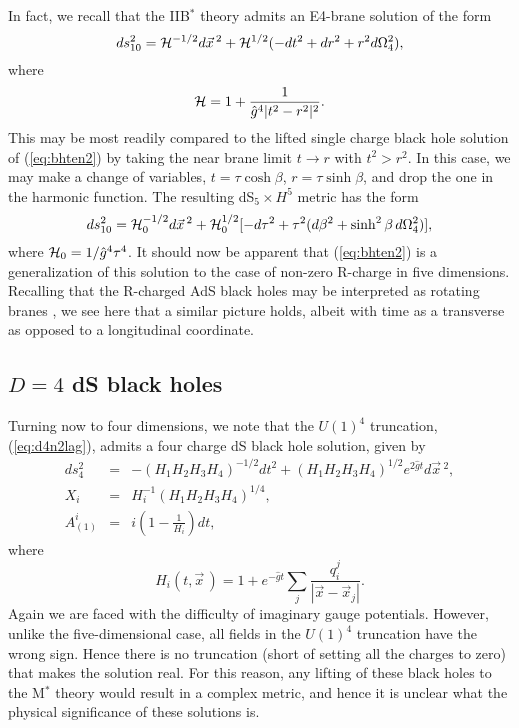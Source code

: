 \documentclass[a4paper,12pt]{article}
\newcommand{\fft}[2]{{\frac{#1}{#2}}}
\begin{document}
In fact, we recall that the IIB$^*$ theory admits an E4-brane solution of
the form \cite{Hull:1998vg}
%
\begin{equation}
ds_{10}^2={\cal H}^{-1/2}d\vec x\,^2+{\cal H}^{1/2}(-dt^2+dr^2+r^2d\Omega_4^2),
\end{equation}
%
where
%
\begin{equation}
{\cal H}=1+\fft1{\hat g^4|t^2-r^2|^2}.
\end{equation}
%
This may be most readily compared to the lifted single charge black hole
solution of (\ref{eq:bhten2}) by taking the near brane limit $t\to r$ with
$t^2>r^2$.  In this case, we may make a change of variables,
$t=\tau\cosh\beta$, $r=\tau\sinh\beta$, and drop the one in the harmonic
function.  The resulting dS$_5\times H^5$ metric has the form
%
\begin{equation}
ds_{10}^2={\cal H}_0^{-1/2}d\vec x\,^2+{\cal H}_0^{1/2}[-d\tau^2
+\tau^2(d\beta^2+\sinh^2\beta\,d\Omega_4^2)],
\end{equation}
%
where ${\cal H}_0=1/\hat g^4\tau^4$.  It should now be apparent that
(\ref{eq:bhten2}) is a generalization of this solution to the case of
non-zero R-charge in five dimensions.  Recalling that the R-charged AdS
black holes may be interpreted as rotating branes \cite{Cvetic}, we see
here that a similar picture holds, albeit with time as a transverse as
opposed to a longitudinal coordinate.

\subsection{$D=4$ dS black holes}

Turning now to four dimensions, we note that the $U(1)^4$ truncation,
(\ref{eq:d4n2lag}), admits a four charge dS black hole solution, given by
%
\begin{eqnarray}
ds_4^2&=&-(H_1H_2H_3H_4)^{-1/2}dt^2 + (H_1H_2H_3H_4)^{1/2}e^{2\hat gt}
d\vec x\,^2,\nonumber\\
X_i&=&H_i^{-1}(H_1H_2H_3H_4)^{1/4},\nonumber\\
A_{(1)}^{i}&=&i\left(1-\frac{1}{H_i}\right)dt,
\label{eq:bhfour}
\end{eqnarray}
%
where
%
\begin{equation}
H_i(t,\vec x\,) = 1 + e^{-\hat{g}t}\sum_j{\frac{q_i^j}{|\vec x-\vec x_j|}}.
\end{equation}
%
Again we are faced with the difficulty of imaginary gauge potentials.
However, unlike the five-dimensional case, all fields in the $U(1)^4$
truncation have the wrong sign.  Hence there is no truncation (short of
setting all the charges to zero) that makes the solution real.  For this
reason, any lifting of these black holes to the M$^*$ theory would result
in a complex metric, and hence it is unclear what the physical
significance of these solutions is.
\end{document}
